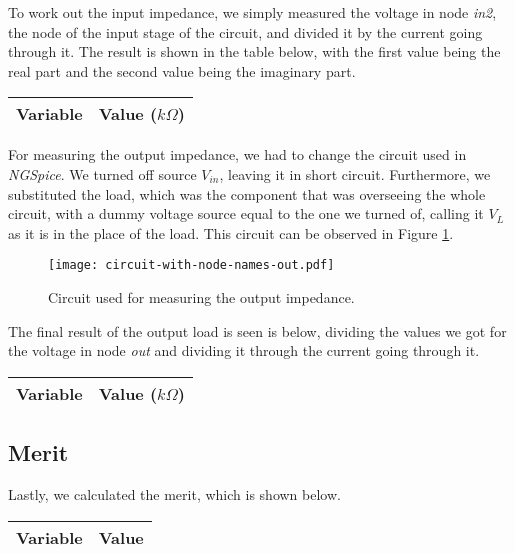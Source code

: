 To work out the input impedance, we simply measured the voltage in node \textit{in2}, the node of the input stage of the circuit, and divided it by the current going through it. The result is shown in the table below, with the first value being the real part and the second value being the imaginary part.

\begin{tabular}{|l|r|}
  \hline    
  {\bf Variable} & {\bf Value ($k\Omega$)} \\ \hline
  
\end{tabular}

For measuring the output impedance, we had to change the circuit used in \textit{NGSpice}. We turned off source $V_{in}$, leaving it in short circuit. Furthermore, we substituted the load, which was the component that was overseeing the whole circuit, with a dummy voltage source equal to the one we turned of, calling it $V_L$ as it is in the place of the load. This circuit can be observed in Figure \ref{fig:circuit-2-spice}.

\begin{figure}[h] \centering
\texttt{[image: circuit-with-node-names-out.pdf]}
\caption{Circuit used for measuring the output impedance.}
\label{fig:circuit-2-spice}
\end{figure}

The final result of the output load is seen is below, dividing the values we got for the voltage in node \textit{out} and dividing it through the current going through it.

\begin{tabular}{|l|r|}
  \hline    
  {\bf Variable} & {\bf Value ($k\Omega$)} \\ \hline
  
\end{tabular}

\subsection{Merit}

Lastly, we calculated the merit, which is shown below.

\begin{tabular}{|l|r|}
  \hline    
  {\bf Variable} & {\bf Value} \\ \hline
  
\end{tabular}